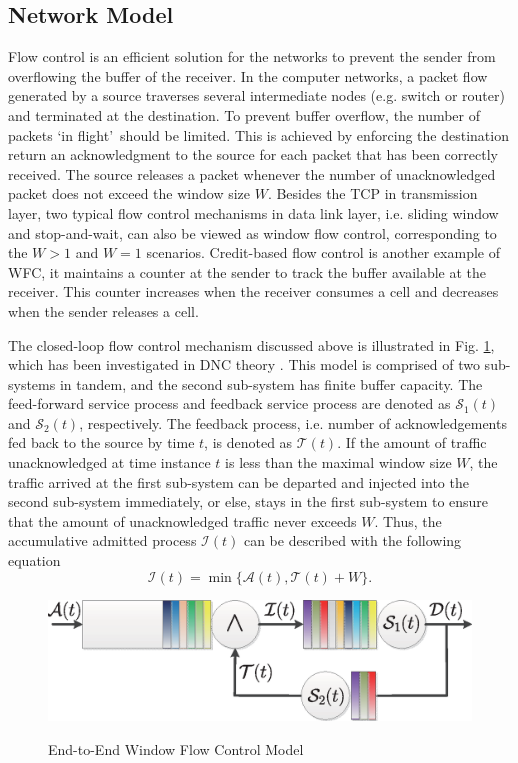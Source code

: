 \documentclass[12pt]{article}
\begin{document}
\subsection{Network Model}\label{model}
Flow control is an efficient solution for the networks to prevent the sender from overflowing the buffer of the receiver. In the computer networks, a packet flow generated by a source traverses several intermediate nodes (e.g. switch or router) and terminated at the destination. To prevent buffer overflow, the number of packets \textquoteleft in flight\textquoteright\ should be limited. This is achieved by enforcing the destination return an acknowledgment to the source for each packet that has been correctly received. The source releases a packet whenever the number of unacknowledged packet does not exceed the window size $W$. Besides the TCP \cite{RFC5681} in transmission layer, two typical flow control mechanisms in data link layer, i.e. sliding window and stop-and-wait, can also be viewed as window flow control, corresponding to the $W>1$ and $W=1$ scenarios. Credit-based flow control is another example of WFC, it maintains a counter at the sender to track the buffer available at the receiver. This counter increases when the receiver consumes a cell and decreases when the sender releases a cell.

The closed-loop flow control mechanism discussed above is illustrated in Fig. \ref{control1}, which has been investigated in DNC theory \cite{CrOk96,AgRa96,Chan98,ACOR99,QLDD09FC,bose2006analysis,Qian2010Analysis}. This model is comprised of two sub-systems in tandem, and the second sub-system has finite buffer capacity. The feed-forward service process and feedback service process are denoted as $\mathcal{S}_1(t)$ and $\mathcal{S}_2(t)$, respectively. The feedback process, i.e. number of acknowledgements fed back to the source by time $t$, is denoted as $\mathcal{T}(t)$. If the amount of traffic unacknowledged at time instance $t$ is less than the maximal window size $W$, the traffic arrived at the first sub-system can be departed and injected into the second sub-system immediately, or else, stays in the first sub-system to ensure that the amount of unacknowledged traffic never exceeds $W$. Thus, the accumulative admitted process $\mathcal{I}(t)$ can be described with the following equation
\begin{equation}\label{wfc}
\mathcal{I}(t)=\min\{\mathcal{A}(t),\mathcal{T}(t)+W\}.
\end{equation}
\begin{figure}[ht]
  \centering\includegraphics[scale=0.45]{figures/QueueModel1.eps}\\
  \caption{End-to-End Window Flow Control Model}\label{control1}
\end{figure}
\end{document}
